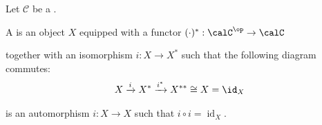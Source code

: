 \begin{definition} \label{definition:dagger_object_in_a_category}

Let $\mathcal{C}$ be a . 

A  is an object $X$ equipped with a functor $(\cdot)^*: \calC^{\op} \to \calC$ 

together with an isomorphism $i: X \to X^*$ such that the following diagram commutes:
$$X \xrightarrow{i} X^* \xrightarrow{i^*} X^{**} \cong X = \id_X$$

is an automorphism $i: X \to X$ such that $i \circ i = \operatorname{id}_X$.
\end{definition}